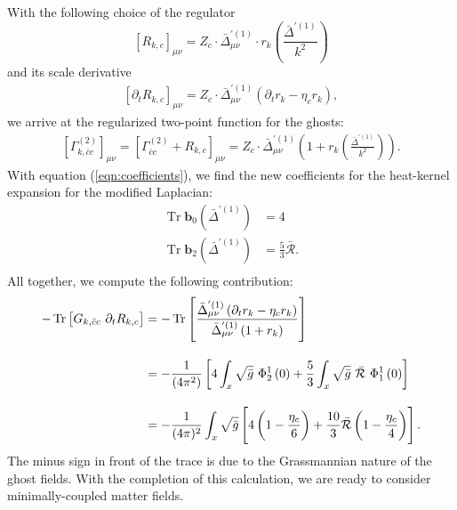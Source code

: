 With the following choice of the regulator 
\begin{equation}
	\left[R_{k,c}\right]_{\mu\nu} = Z_c\cdot\bar{\Delta}_{\mu\nu}^{'(1)}\cdot r_k\left(\frac{\bar{\Delta}^{'(1)}}{k^2}\right)
\end{equation}
and its scale derivative
\begin{align}
	\left[\partial_t R_{k,c}\right]_{\mu\nu} =  Z_c\cdot\bar{\Delta}_{\mu\nu}^{'(1)}\left(\partial_tr_k - \eta_c r_k\right),
\end{align}
we arrive at the regularized two-point function for the ghosts: 
\begin{align}
	\left[\Gamma^{(2)}_{k, \bar{c}c}\right]_{\mu\nu} = \left[\Gamma^{(2)}_{\bar{c}c}+ R_{k, c}\right]_{\mu\nu}  = Z_c \cdot\bar{\Delta}_{\mu\nu}^{'(1)}\left(1 + r_k\left(\frac{\bar{\Delta}^{'(1)}}{k^2}\right)\right).
\end{align}
With equation (\ref{eqn:coefficients}), we find the new coefficients for the heat-kernel expansion for the modified Laplacian:
\begin{equation}
\begin{aligned}
	\operatorname{Tr}\mathbf{b}_0\left(\bar{\Delta}^{'(1)}\right) &= 4  \\
	\operatorname{Tr}\mathbf{b}_2\left(\bar{\Delta}^{'(1)}\right) &= \frac{5}{3}\bar{\mathcal{R}}.\\
\end{aligned} 
\end{equation}
All together, we compute the following contribution:
\begin{equation}
\begin{aligned}
	-\operatorname{Tr}\left[ G_{k, \bar{c}c}\ \partial_t R_{k,c} \right] &= -\operatorname{Tr}\left[ \frac{\bar{\Delta}_{\mu\nu}^{'(1)}\left(\partial_t r_k - \eta_c r_k\right)}{\bar{\Delta}_{\mu\nu}^{'(1)}\left(1 + r_k\right)} \right] \\[10pt]
	&=  - \frac{1}{\left(4 \pi^{2}\right)}\left[4\int_{x} \sqrt{\bar{g}}\ \Phi_{2}^{1}\left(0\right)+\frac{5}{3} \int_{x} \sqrt{\bar{g}} \ \bar{\mathcal{R}} \ \Phi_{1}^{1}\left(0\right)\right] \\[10pt]
	&= -\frac{1}{(4\pi)^2}\int_x\sqrt{\bar{g}}\left[4\left(1-\frac{\eta_c}{6}\right) + \frac{10}{3}\bar{\mathcal{R}}\left(1-\frac{\eta_c}{4}\right)\right].
\end{aligned}
\end{equation}
The minus sign in front of the trace is due to the Grassmannian nature of the ghost fields. With the completion of this calculation, we are ready to consider minimally-coupled matter fields.
